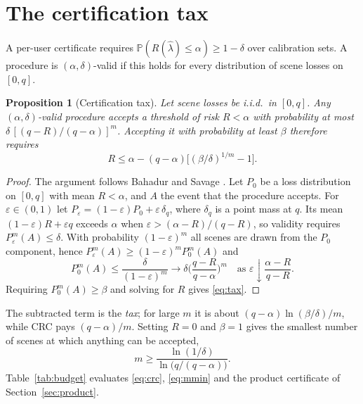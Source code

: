 \documentclass[11pt,a4paper]{article}
\newtheorem{proposition}{Proposition}
\theoremstyle{definition}
\theoremstyle{remark}
\newcommand{\Prob}{\mathbb{P}}
\newcommand{\1}{\mathbf{1}}
\begin{document}
\section{The certification tax}

A per-user certificate requires $\Prob(R(\hat\lambda)\le\alpha)\ge1-\delta$ over calibration sets. A procedure is $(\alpha,\delta)$-valid if this holds for every distribution of scene losses on $[0,q]$.

\begin{proposition}[Certification tax]\label{prop:tax}
Let scene losses be i.i.d.\ in $[0,q]$. Any $(\alpha,\delta)$-valid procedure accepts a threshold of risk $R<\alpha$ with probability at most $\delta\,[(q-R)/(q-\alpha)]^{m}$. Accepting it with probability at least $\beta$ therefore requires
\begin{equation}
R\le\alpha-(q-\alpha)\Big[(\beta/\delta)^{1/m}-1\Big].
\label{eq:tax}
\end{equation}
\end{proposition}

\begin{proof}
The argument follows Bahadur and Savage \cite{bahadur}. Let $P_0$ be a loss distribution on $[0,q]$ with mean $R<\alpha$, and $A$ the event that the procedure accepts. For $\varepsilon\in(0,1)$ let $P_\varepsilon=(1-\varepsilon)P_0+\varepsilon\,\delta_q$, where $\delta_q$ is a point mass at $q$. Its mean $(1-\varepsilon)R+\varepsilon q$ exceeds $\alpha$ when $\varepsilon>(\alpha-R)/(q-R)$, so validity requires $P_\varepsilon^m(A)\le\delta$. With probability $(1-\varepsilon)^m$ all scenes are drawn from the $P_0$ component, hence $P_\varepsilon^m(A)\ge(1-\varepsilon)^mP_0^m(A)$ and
\[
P_0^m(A)\le\frac{\delta}{(1-\varepsilon)^m}\longrightarrow\delta\Big(\frac{q-R}{q-\alpha}\Big)^m
\quad\text{as }\varepsilon\downarrow\frac{\alpha-R}{q-R}.
\]
Requiring $P_0^m(A)\ge\beta$ and solving for $R$ gives \eqref{eq:tax}.
\end{proof}

The subtracted term is the \emph{tax}; for large $m$ it is about $(q-\alpha)\ln(\beta/\delta)/m$, while CRC pays $(q-\alpha)/m$. Setting $R=0$ and $\beta=1$ gives the smallest number of scenes at which anything can be accepted,
\begin{equation}
m\ge\frac{\ln(1/\delta)}{\ln\bigl(q/(q-\alpha)\bigr)}.
\label{eq:mmin}
\end{equation}
Table~\ref{tab:budget} evaluates \eqref{eq:crc}, \eqref{eq:mmin} and the product certificate of Section~\ref{sec:product}.
\end{document}
